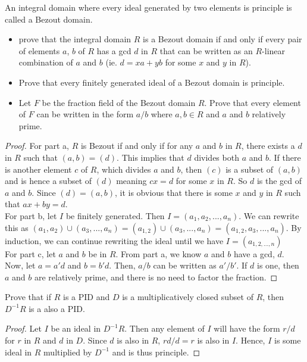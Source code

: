 \documentclass[10pt]{article}
\newenvironment{problem}[2][Problem]{\begin{trivlist}
		\item[\hskip \labelsep {\bfseries #1}\hskip \labelsep {\bfseries #2.}]}{\end{trivlist}}
\begin{document}
		\begin{problem}{2.7}
			An integral domain where every ideal generated by two elements is principle is called a Bezout domain.
			\begin{itemize}
				\item[(a)]prove that the integral domain $R$ is a Bezout domain if and only if every pair of elements $a$, $b$ of $R$ has a gcd $d$ in $R$ that can be written as an $R$-linear combination of $a$ and $b$ (ie. $d=xa+yb$ for some $x$ and $y$ in $R$).
				\item[(b)]Prove that every finitely generated ideal of a Bezout domain is principle.
				\item[(c)] Let $F$ be the fraction field of the Bezout domain $R$. Prove that every element of $F$ can be written in the form $a/b$ where $a,b \in R$ and $a$ and $b$ relatively prime.
			\end{itemize}
			
			\begin{proof}
				For part a, $R$ is Bezout if and only if for any $a$ and $b$ in $R$, there exists a $d$ in $R$ such that $(a,b)=(d)$. This implies that $d$ divides both $a$ and $b$. If there is another element $c$ of $R$, which divides $a$ and $b$, then $(c)$ is a subset of $(a,b)$ and is hence a subset of $(d)$ meaning $cx=d$ for some $x$ in $R$. So $d$ is the gcd of $a$ and $b$. Since $(d)=(a,b)$, it is obvious that there is some $x$ and $y$ in $R$ such that $ax+by=d$.\\
				
				For part b, let $I$ be finitely generated. Then $I = (a_{1}, a_{2}, ... ,a_{n})$. We can rewrite this as $(a_{1}, a_{2}) \cup (a_{3}, ... , a_{n}) = (a_{1,2}) \cup (a_{3}, ... , a_{n}) = (a_{1,2}, a_{3}, ... , a_{n})$. By induction, we can continue rewriting the ideal until we have $I=(a_{1,2,...,n})$\\
				
				For part c, let $a$ and $b$ be in $R$. From part a, we know $a$ and $b$ have a gcd, $d$. Now, let $a = a'd$ and $b=b'd$. Then, $a/b$ can be written as $a'/b'$. If $d$ is one, then $a$ and $b$ are relatively prime, and there is no need to factor the fraction.
			\end{proof}
		\end{problem}
		
		\begin{problem}{2.8}
			Prove that if $R$ is a PID and $D$ is a multiplicatively closed subset of $R$, then $D^{-1}R$ is a also a PID.
			\begin{proof}
				Let $I$ be an ideal in $D^{-1}R$. Then any element of $I$ will have the form $r/d$ for $r$ in $R$ and $d$ in $D$. Since $d$ is also in $R$, $rd/d=r$ is also in $I$. Hence, $I$ is some ideal in $R$ multiplied by $D^{-1}$ and is thus principle.
			\end{proof}
		\end{problem}
		
\end{document}
